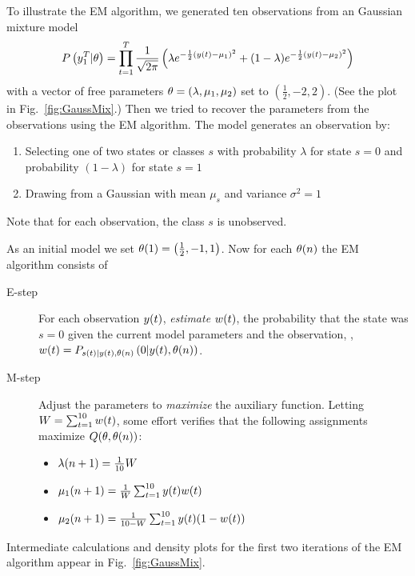 To illustrate the EM algorithm, we generated ten observations from an
\iid Gaussian mixture model 
\begin{equation}
  \label{eq:GaussMix}
  P\left(y_{1}^{T}|\theta \right) = \prod_{t=1}^T
  \frac{1}{\sqrt{2\pi}} \left( \lambda e^{-\frac{1}{2}
  ({y}{(t)}-\mu_1)^2} +
  (1-\lambda) e^{-\frac{1}{2} ({y}{(t)}-\mu_2)^2 } \right)
\end{equation}
with a vector of free parameters $\theta = (\lambda,\mu_1,\mu_2)$ set
to $(\frac{1}{2},-2,2)$.  (See the plot in Fig.~\ref{fig:GaussMix}.)
Then we tried to recover the parameters from the observations using
the EM algorithm.  The model generates an observation by:
\begin{enumerate}
\item Selecting one of two states or classes $s$ with probability
  $\lambda$ for state $s=0$ and probability $(1-\lambda)$ for state $s=1$
\item Drawing from a Gaussian with mean $\mu_s$ and variance $\sigma^2
  = 1$
\end{enumerate}
Note that for each observation, the class $s$ is unobserved.

As an initial model we set ${\theta}{(1)} = \left( \frac{1}{2}, -1, 1
\right)$.  Now for each ${\theta}{(n)}$ the EM algorithm consists of
\begin{description}
\item[E-step] For each observation ${y}{(t)}$, \emph{estimate}
  ${w}{(t)}$, the probability that the state was $s=0$ given the
  current model parameters and the observation, \ie, ${w}{(t)} =
  P_{{s}{(t)}|{y}{(t)},{\theta}{(n)}} \left(0|{y}{(t)},
    {\theta}{(n)}\right)$.
\item[M-step] Adjust the parameters to \emph{maximize} the auxiliary
  function.  Letting $W = \sum_{t=1}^{10} {w}{(t)}$, some effort
  verifies that the following assignments maximize
  $Q(\theta,{\theta}{(n)})$:
  \begin{itemize}
  \item ${\lambda}{(n+1)} = \frac{1}{10} W$
  \item ${\mu_1}{(n+1)} = \frac{1}{W}\sum_{t=1}^{10} {y}{(t)} {w}{(t)}$
  \item ${\mu_2}{(n+1)} = \frac{1}{10-W}\sum_{t=1}^{10} {y}{(t)} (1-{w}{(t)})$
  \end{itemize}
\end{description}

Intermediate calculations and density plots for the first two
iterations of the EM algorithm appear in Fig.~\ref{fig:GaussMix}.

